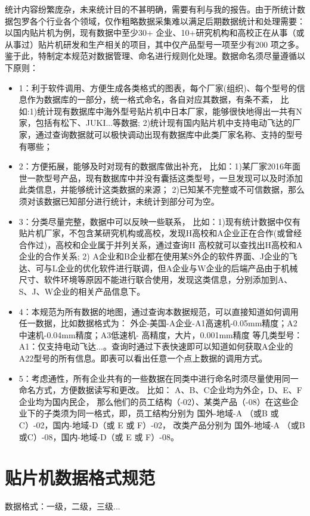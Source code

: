 \documentclass[a4paper,12pt]{article}
\begin{document}
统计内容纷繁庞杂，未来统计目的不甚明确，需要有利与我的报告。由于所统计数据包罗各个行业各个领域，仅作粗略数据采集难以满足后期数据统计和处理需要： 以国内贴片机为例，现有数据中至少30+ 企业、10+研究机构和高校正在从事（或从事过）贴片机研发和生产相关的项目，其中仅产品型号一项至少有200 项之多。鉴于此，特制定本规范对数据管理、命名进行规则化处理。数据命名须尽量遵循以下原则：
\begin{itemize}
  \item 1：利于软件调用、方便生成各类格式的图表，每个厂家(组织)、每个型号的信息作为数据库的一部分，统一格式命名，各自对应其数据，有条不紊，
       比如:1)统计现有数据库中海外型号贴片机中日本厂家，能够很快地得出一共有N家，包括有松下、JUKI...等数据; 2)统计现有国内贴片机中支持电动飞达的厂家，通过查询数据就可以极快调动出现有数据库中此类厂家名称、支持的型号有哪些；
  \item 2：方便拓展，能够及时对现有的数据库做出补充，
        比如：1)某厂家2016年面世一款型号产品，现有数据库中并没有囊括这类型号，一旦发现可以及时添加此类信息，并能够统计这类数据的来源； 2)已知某不完整或不可信数据，那么须对该数据已知部分进行统计，未统计到部分可为空。
  \item 3：分类尽量完整，数据中可以反映一些联系，
        比如：1)现有统计数据中仅有贴片机厂家，不包含某研究机构或高校，发现H高校和A企业正在合作(或曾经合作过)，高校和企业属于并列关系，通过查询H 高校就可以查找出H高校和A企业的合作关系; 2) A企业和B企业都在使用某S外企的软件界面、J企业的飞达、可与L企业的优化软件进行联调，但A企业与W企业的后端产品由于机械尺寸、软件环境等原因不能进行联合使用，发现这类信息，分别添加到A、S、J、W企业的相关产品信息下。
  \item 4：本规范为所有数据的地图，通过查询本数据规范，可以直接知道如何调用任一数据，比如数据格式为： 外企-美国-A企业-A1高速机-0.05mm精度；A2中速机-0.04mm精度；A3低速机- 高精度，大片，0.001mm精度 等几类型号：A1：仅支持电动飞达...。查询时通过下表快速即可以知道如何获取A企业的A22型号的所有信息。即表可以看出任意一个点上数据的调用方式。
  \item 5：考虑通性，所有企业共有的一些数据在同类中进行命名时须尽量使用同一命名方式，方便数据读写和更改。 比如： A、B、C企业均为外企，D、E、F企业均为国内民企， 那么他们的员工结构（-02）、某类产品（-08）在这些企业下的子类须为同一格式，即，员工结构分别为 国外-地域-A （或B 或C）-02，国内-地域-D（或 E 或 F）-02， 改类产品分别为 国外-地域-A （或B 或C）-08，国内-地域-D（或 E 或 F）-08。
\end{itemize}



\section{贴片机数据格式规范}
数据格式：一级，二级，三级...
\end{document}
